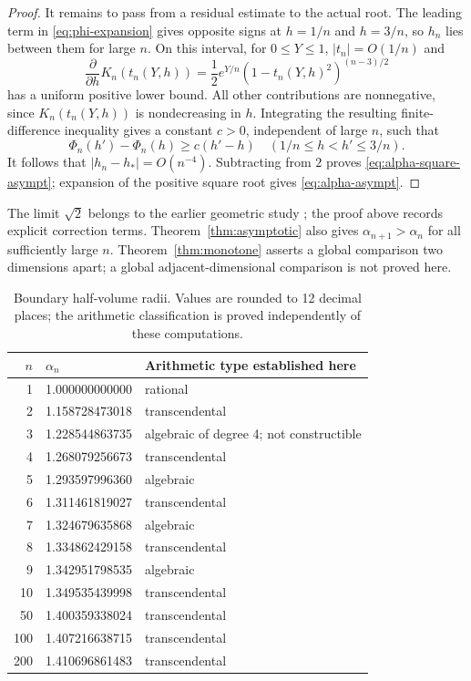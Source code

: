 \documentclass[11pt,a4paper]{article}
\numberwithin{equation}{section}
\theoremstyle{definition}
\theoremstyle{remark}
\begin{document}
\begin{proof}
It remains to pass from a residual estimate to the actual root. The leading term in \eqref{eq:phi-expansion} gives opposite signs at $h=1/n$ and $h=3/n$, so $h_n$ lies between them for large $n$. On this interval, for $0\leq Y\leq1$, $|t_n|=O(1/n)$ and
\[
 \frac{\partial}{\partial h}K_n(t_n(Y,h))
 =\frac12e^{Y/n}(1-t_n(Y,h)^2)^{(n-3)/2}
\]
has a uniform positive lower bound. All other contributions are nonnegative, since $K_n(t_n(Y,h))$ is nondecreasing in $h$. Integrating the resulting finite-difference inequality gives a constant $c>0$, independent of large $n$, such that
\[
 \Phi_n(h')-\Phi_n(h)\geq c(h'-h)
 \quad(1/n\leq h<h'\leq3/n).
\]
It follows that $|h_n-h_*|=O(n^{-4})$. Subtracting from $2$ proves \eqref{eq:alpha-square-asympt}; expansion of the positive square root gives \eqref{eq:alpha-asympt}.
\end{proof}

The limit $\sqrt2$ belongs to the earlier geometric study \cite{Fraser,Meyerson}; the proof above records explicit correction terms. Theorem~\ref{thm:asymptotic} also gives $\alpha_{n+1}>\alpha_n$ for all sufficiently large $n$. Theorem~\ref{thm:monotone} asserts a global comparison two dimensions apart; a global adjacent-dimensional comparison is not proved here.

\begin{table}[ht]
\centering
\caption{Boundary half-volume radii. Values are rounded to 12 decimal places; the arithmetic classification is proved independently of these computations.}
\label{tab:alpha}
\begin{tabular}{rll}
\toprule
$n$ & $\alpha_n$ & Arithmetic type established here\\
\midrule
1 & 1.000000000000 & rational\\
2 & 1.158728473018 & transcendental\\
3 & 1.228544863735 & algebraic of degree 4; not constructible\\
4 & 1.268079256673 & transcendental\\
5 & 1.293597996360 & algebraic\\
6 & 1.311461819027 & transcendental\\
7 & 1.324679635868 & algebraic\\
8 & 1.334862429158 & transcendental\\
9 & 1.342951798535 & algebraic\\
10 & 1.349535439998 & transcendental\\
50 & 1.400359338024 & transcendental\\
100 & 1.407216638715 & transcendental\\
200 & 1.410696861483 & transcendental\\
\bottomrule
\end{tabular}
\end{table}
\end{document}
